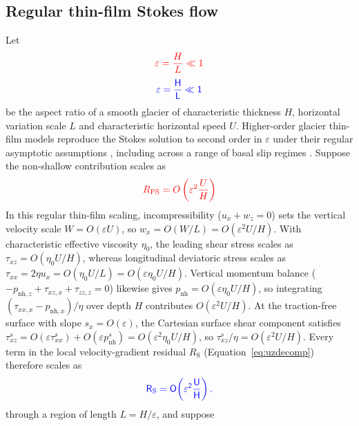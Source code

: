 \documentclass[review]{igs}
\providecommand{\DIFadd}[1]{{\protect\color{blue} \sf #1}} %
\providecommand{\DIFdel}[1]{{\protect\color{red} \scriptsize #1}} %
\providecommand{\DIFaddbegin}{} %
\providecommand{\DIFaddend}{} %
\providecommand{\DIFdelbegin}{} %
\providecommand{\DIFdelend}{} %
\newcommand{\DIFscaledelfig}{0.5}
\newlength{\DIFdelgraphicswidth} %
\newlength{\DIFdelgraphicsheight} %
\newcommand{\DIFaddincludegraphics}[2][]{{\color{blue}\fbox{\DIFOincludegraphics[#1]{#2}}}} %
\newcommand{\DIFdelincludegraphics}[2][]{%
\sbox{\DIFdelgraphicsbox}{\DIFOincludegraphics[#1]{#2}}%
\settoboxwidth{\DIFdelgraphicswidth}{\DIFdelgraphicsbox} %
\settoboxtotalheight{\DIFdelgraphicsheight}{\DIFdelgraphicsbox} %
\scalebox{\DIFscaledelfig}{%
\parbox[b]{\DIFdelgraphicswidth}{\usebox{\DIFdelgraphicsbox}\\[-\baselineskip] \rule{\DIFdelgraphicswidth}{0em}}\llap{\resizebox{\DIFdelgraphicswidth}{\DIFdelgraphicsheight}{%
\setlength{\unitlength}{\DIFdelgraphicswidth}%
\begin{picture}(1,1)%
\thicklines\linethickness{2pt} %
{\color[rgb]{1,0,0}\put(0,0){\framebox(1,1){}}}%
{\color[rgb]{1,0,0}\put(0,0){\line( 1,1){1}}}%
{\color[rgb]{1,0,0}\put(0,1){\line(1,-1){1}}}%
\end{picture}%
}\hspace*{3pt}}} %
} %
\DeclareRobustCommand{\DIFaddbegin}{\DIFOaddbegin \let\includegraphics\DIFaddincludegraphics} %
\DeclareRobustCommand{\DIFaddend}{\DIFOaddend \let\includegraphics\DIFOincludegraphics} %
\DeclareRobustCommand{\DIFdelbegin}{\DIFOdelbegin \let\includegraphics\DIFdelincludegraphics} %
\DeclareRobustCommand{\DIFdelend}{\DIFOaddend \let\includegraphics\DIFOincludegraphics} %
\begin{document}
\DIFdelbegin %
\DIFdelend \DIFaddbegin \subsection{Regular thin-film Stokes flow}
\DIFaddend 

Let
\DIFdelbegin \begin{displaymath}
\DIFdel{\varepsilon=\frac{H}{L}\ll1
}\end{displaymath}%
\DIFdelend \DIFaddbegin \begin{equation}
\DIFadd{\varepsilon=\frac{H}{L}\ll1
\label{eq:aspectratio}
}\end{equation}\DIFaddend 
be the aspect ratio of a smooth glacier \DIFaddbegin \DIFadd{of characteristic thickness \(H\), horizontal variation scale \(L\) and characteristic horizontal speed \(U\)}\DIFaddend . Higher-order \DIFdelbegin \DIFdel{glacier }\DIFdelend \DIFaddbegin \DIFadd{thin-film }\DIFaddend models reproduce the Stokes solution to second order in \(\varepsilon\) under \DIFdelbegin \DIFdel{their }\DIFdelend regular asymptotic assumptions \DIFdelbegin \DIFdel{, including }\DIFdelend \DIFaddbegin \DIFadd{across }\DIFaddend a range of basal slip regimes \citep{Blatter1995,SchoofHindmarsh2010}. \DIFdelbegin \DIFdel{Suppose the non-shallow contribution scales as }\begin{displaymath}
\DIFdel{R_{\mathrm{FS}}=O\left(\varepsilon^2\frac{U}{H}\right)
}\end{displaymath}%
\DIFdelend \DIFaddbegin \DIFadd{In this regular thin-film scaling, incompressibility (\(u_x+w_z=0\)) sets the vertical velocity scale \(W=O(\varepsilon U)\), so \(w_x=O(W/L)=O(\varepsilon^2 U/H)\). With characteristic effective viscosity \(\eta_0\), the leading shear stress scales as \(\tau_{xz}=O(\eta_0 U/H)\), whereas longitudinal deviatoric stress scales as \(\tau_{xx}=2\eta u_x=O(\eta_0 U/L)=O(\varepsilon\eta_0 U/H)\). Vertical momentum balance (\(-p_{\mathrm{nh},z}+\tau_{xz,x}+\tau_{zz,z}=0\)) likewise gives \(p_{\mathrm{nh}}=O(\varepsilon\eta_0 U/H)\), so integrating \((\tau_{xx,x}-p_{\mathrm{nh},x})/\eta\) over depth \(H\) contributes \(O(\varepsilon^2 U/H)\). At the traction-free surface with slope \(s_x=O(\varepsilon)\), the Cartesian surface shear component satisfies \(\tau_{xz}^{s}=O(\varepsilon\tau_{xx}^{s})+O(\varepsilon p_{\mathrm{nh}}^{s})=O(\varepsilon^2\eta_0 U/H)\), so \(\tau_{xz}^{s}/\eta=O(\varepsilon^2 U/H)\). Every term in the local velocity-gradient residual \(R_{\mathrm{S}}\) (Equation~\ref{eq:uzdecomp}) therefore scales as
}\begin{equation}
\DIFadd{R_{\mathrm{S}}=O\!\left(\varepsilon^2\frac{U}{H}\right).
\label{eq:RFSscale}
}\end{equation}\DIFaddend 
\DIFdelbegin \DIFdel{through a region of length \(L=H/\varepsilon\), and suppose }\DIFdelend \DIFaddbegin 
\end{document}
